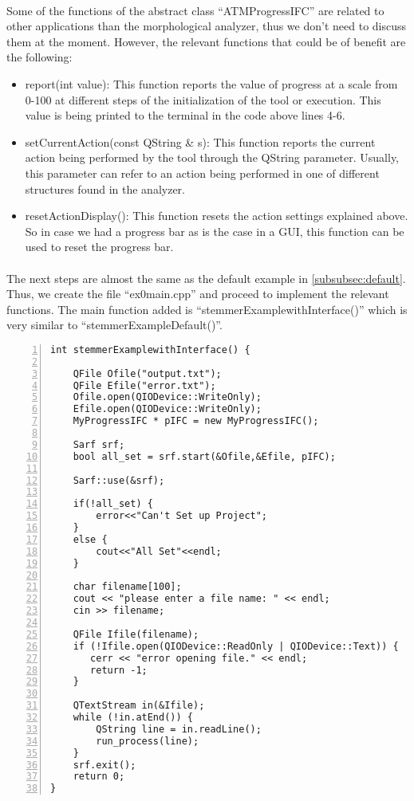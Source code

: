 \documentclass{article}
\begin{document}
\paragraph{}
Some of the functions of the abstract class ``ATMProgressIFC'' are related to other applications than the morphological analyzer, thus we don't need to discuss them at the moment. However, the relevant functions that could be of benefit are the following:

\begin{itemize}
\item report(int value): This function reports the value of progress at a scale from 0-100 at different steps of the initialization of the tool or execution. This value is being printed to the terminal in the code above lines 4-6.
\item setCurrentAction(const QString \& s): This function reports the current action being performed by the tool through the QString parameter. Usually, this parameter can refer to an action being performed in one of different structures found in the analyzer.
\item resetActionDisplay(): This function resets the action settings explained above. So in case we had a progress bar as is the case in a GUI, this function can be used to reset the progress bar.
\end{itemize}

\paragraph{}
The next steps are almost the same as the default example in \ref{subsubsec:default}. Thus, we create the file ``ex0main.cpp'' and proceed to implement the relevant functions. The main function added is ``stemmerExamplewithInterface()'' which is very similar to ``stemmerExampleDefault()''.

\begin{Verbatim}[numbers=left]
int stemmerExamplewithInterface() {

    QFile Ofile("output.txt");
    QFile Efile("error.txt");
    Ofile.open(QIODevice::WriteOnly);
    Efile.open(QIODevice::WriteOnly);
    MyProgressIFC * pIFC = new MyProgressIFC();

    Sarf srf;
    bool all_set = srf.start(&Ofile,&Efile, pIFC);

    Sarf::use(&srf);

    if(!all_set) {
        error<<"Can't Set up Project";
    }
    else {
        cout<<"All Set"<<endl;
    }

    char filename[100];
    cout << "please enter a file name: " << endl;
    cin >> filename;

    QFile Ifile(filename);
    if (!Ifile.open(QIODevice::ReadOnly | QIODevice::Text)) {
       cerr << "error opening file." << endl;
       return -1;
    }

    QTextStream in(&Ifile);
    while (!in.atEnd()) {
        QString line = in.readLine();
        run_process(line);
    }
    srf.exit();
    return 0;
}
\end{Verbatim}
\end{document}
